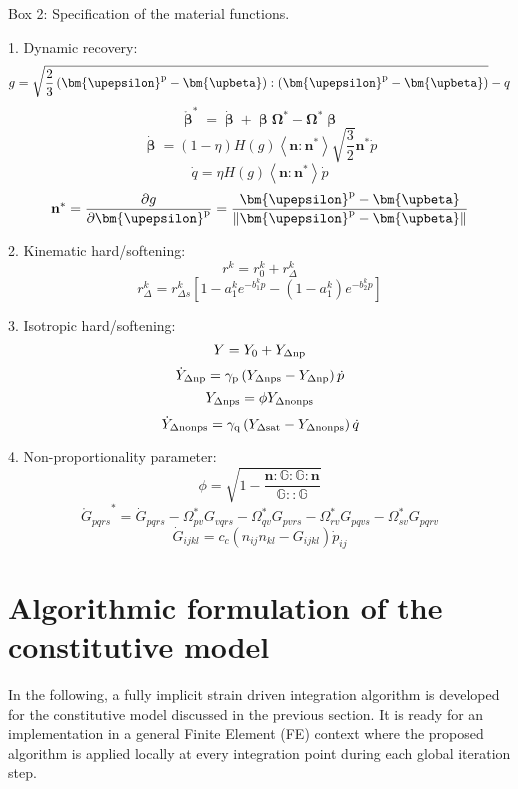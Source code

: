 \begin{framed}
\label{Box:1}
Box 2: Specification of the material functions.

1. Dynamic recovery:
\[g = \sqrt {\frac{2}{3}\left( {{{\bm{\upepsilon }}^{\rm{p}}} - {\bm{\upbeta}}} \right):\left( {{{\bm{\upepsilon }}^{\rm{p}}} - {\bm{\upbeta}}} \right)}  - q\]
\[{\mathring {\bm{\upbeta }}^{*}} = \dot {\bm{\upbeta }}  + \bm{\upbeta } {{\mathbf{\Omega }}^*} - {{\mathbf{\Omega }}^*}\bm{\upbeta }\]
\[\dot{\bm{\upbeta}}  = \left( {1 - \eta } \right)H\left( g \right)\left\langle {{\mathbf{n}}:{{\mathbf{n}}^*}} \right\rangle \sqrt {\frac{3}{2}} {{\mathbf{n}}^*}\dot p\]
\[\dot q = \eta H\left( g \right)\left\langle {{\mathbf{n}}:{{\mathbf{n}}^*}} \right\rangle \dot p\]
\[{{\mathbf{n}}^*} = \frac{{\partial g}}{{\partial {{\bm{\upepsilon }}^{\rm{p}}}}} = \frac{{{{\bm{\upepsilon }}^{\rm{p}}} - {\bm{\upbeta}}}}{{\left\| {{{\bm{\upepsilon }}^{\rm{p}}} - {\bm{\upbeta}}} \right\|}}\]


2. Kinematic hard/softening:
\[{r^k} = r_0^k + r_\Delta ^k\]
\[r_\Delta ^k = r_{\Delta s}^k\left[ {1 - a_1^k{e^{ - b_1^kp}} - (1-a_1^k){e^{ - b_2^kp}} }\right]\]


3. Isotropic hard/softening:
\[Y = {Y_0} + {Y_{\Delta \rm np}}\]
\[{\dot Y_{\Delta \rm np}} = {\gamma _{\rm p}}\left( {{Y_{\Delta \rm nps}} - {Y_{\Delta \rm np}}} \right)\dot p\]
\[{Y_{\Delta \rm nps}} = \phi {Y_{\Delta \rm nonps}}\]
\[{\dot Y_{\Delta \rm nonps}} = {\gamma _{\rm q}}\left( {{Y_{\Delta \rm sat}} - {Y_{\Delta \rm nonps}}} \right)\dot q\]


4. Non-proportionality parameter:
\[\phi  = \sqrt {1 - \frac{{{\mathbf{n}}:\mathbb{G}:\mathbb{G}:{\mathbf{n}}}}{{\mathbb{G}::\mathbb{G}}}} \]
\[{\mathring G _{pqrs}}^* = {{\dot G}_{pqrs}} - \Omega _{pv}^*{G_{vqrs}} - \Omega _{qv}^*{G_{pvrs}} - \Omega _{rv}^*{G_{pqvs}} - \Omega _{sv}^*{G_{pqrv}}\]
\[{{\dot G}_{ijkl}} = {c_c}\left( {{n_{ij}}{n_{kl}} - {G_{ijkl}}} \right){{\dot p}_{ij}}\]
\end{framed}

\section{Algorithmic formulation of the constitutive model}
\noindent
In the following, a fully implicit strain driven integration algorithm is developed for the constitutive model discussed in the previous section. It is ready for an implementation in a general Finite Element (FE) context where the proposed algorithm is applied locally at every integration point during each global iteration step.

